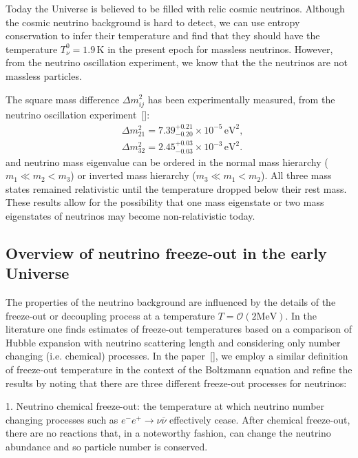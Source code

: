 Today the Universe is believed to be filled with relic cosmic neutrinos. Although the cosmic neutrino background is hard to detect, we can use entropy conservation to infer their temperature and find that they should have the temperature $T_\nu^0=1.9\,\mathrm{K}$ in the present epoch for  massless neutrinos. However, from the neutrino oscillation experiment, we know that the the neutrinos are not massless particles. 

The square mass difference $\Delta m^2_{ij}$ has been experimentally measured, from the neutrino oscillation experiment~[\cite{ParticleDataGroup:2022pth}]:
\begin{align}
&\Delta{m}_{21}^2=7.39^{+0.21}_{-0.20}\times10^{-5}\,\mathrm{eV}^2,\\
&\Delta{m}_{32}^2=2.45^{+0.03}_{-0.03}\times10^{-3}\,\mathrm{eV}^2.
\end{align}
and neutrino mass eigenvalue can be ordered in the normal mass hierarchy ($m_1\ll m_2<m_3$) or inverted mass hierarchy ($m_3\ll m_1<m_2$). All three mass states remained relativistic until the temperature dropped below their rest mass. These results allow for the possibility that one mass eigenstate or two mass eigenstates of neutrinos may become non-relativistic today. 

\subsection{Overview of neutrino freeze-out in the early Universe}


The properties of the neutrino background are influenced by the details of the freeze-out or decoupling process at a temperature $T=\mathcal{O}(2\mathrm{MeV})$. In the literature one finds estimates of freeze-out temperatures based on a comparison of Hubble expansion with neutrino scattering length and considering only number changing (i.e. chemical) processes. In the paper~[\cite{Birrell:2014uka}], we employ a similar definition of freeze-out temperature in the context of the Boltzmann equation and refine the results by noting that there are three different freeze-out processes for neutrinos:


1. Neutrino chemical freeze-out: the temperature at which neutrino number changing processes such as $e^-e^+\to\nu\overline\nu$ effectively cease. After chemical freeze-out, there are no reactions that, in a noteworthy fashion, can
change the neutrino abundance and so particle number is conserved. %

